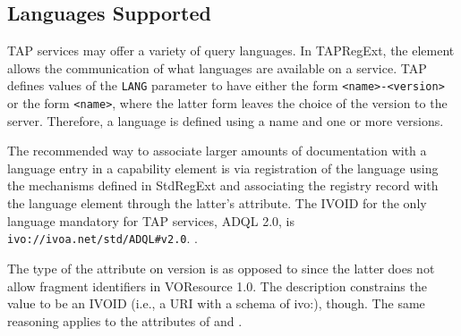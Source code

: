 \documentclass{ivoa}
\begin{document}

\subsection{Languages Supported}

\label{langs}

TAP services may offer a variety of query languages.  In TAPRegExt, the
 element allows the communication of what languages are
available on a service.  TAP defines values of the \texttt{LANG} parameter
to have either the form \texttt{<name>-<version>} or the form
\texttt{<name>}, where the latter form leaves the choice of the
version to the server.  Therefore, a language is defined using a name and one
or more versions.

The recommended way to associate larger amounts of documentation with a
language entry in a capability element is via registration of the language
using the mechanisms defined in StdRegExt \citep{2012ivoa.spec.0508H} and associating
the registry record with the language element through the latter's
attribute.  The IVOID for the only language mandatory for TAP services,
ADQL 2.0, is
\nolinkurl{ivo://ivoa.net/std/ADQL#v2.0}.
.

The type of the  attribute on version is
 as opposed to  since
the latter does not allow fragment identifiers in VOResource 1.0.
The description constrains the value to be an
IVOID (i.e., a URI with a schema of ivo:), though.
The same reasoning applies to the 
attributes of  and .
\end{document}
